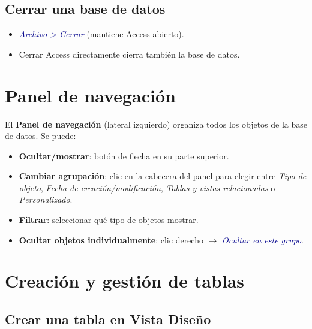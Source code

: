 \documentclass[12pt,a4paper]{article}
\newcommand{\menu}[1]{\textit{\textcolor{darkblue}{#1}}}
\begin{document}
\subsection{Cerrar una base de datos}

\begin{itemize}
  \item \menu{Archivo > Cerrar} (mantiene Access abierto).
  \item Cerrar Access directamente cierra también la base de datos.
\end{itemize}

\section{Panel de navegación}

El \textbf{Panel de navegación} (lateral izquierdo) organiza todos los objetos de la base de datos. Se puede:

\begin{itemize}
  \item \textbf{Ocultar/mostrar}: botón de flecha en su parte superior.
  \item \textbf{Cambiar agrupación}: clic en la cabecera del panel para elegir entre \emph{Tipo de objeto}, \emph{Fecha de creación/modificación}, \emph{Tablas y vistas relacionadas} o \emph{Personalizado}.
  \item \textbf{Filtrar}: seleccionar qué tipo de objetos mostrar.
  \item \textbf{Ocultar objetos individualmente}: clic derecho $\rightarrow$ \menu{Ocultar en este grupo}.
\end{itemize}

\section{Creación y gestión de tablas}

\subsection{Crear una tabla en Vista Diseño}
\end{document}
